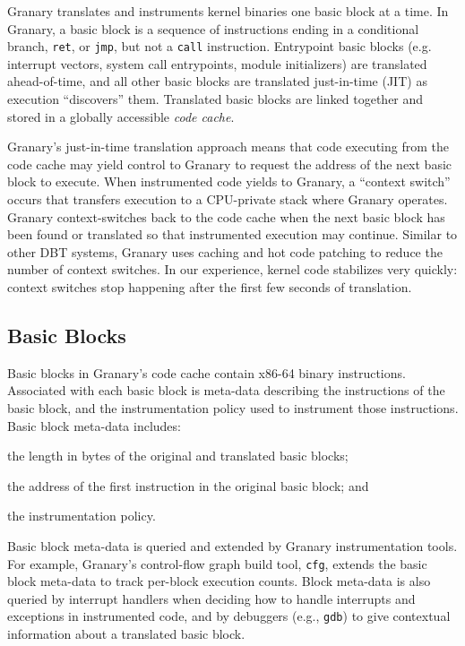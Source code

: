 \documentclass[preprint]{sigplanconf}
\begin{document}
Granary translates and instruments kernel binaries one basic block at a time. In Granary, a basic block is a sequence of instructions ending in a conditional branch, \texttt{ret}, or \texttt{jmp}, but not a \texttt{call} instruction. Entrypoint basic blocks (e.g. interrupt vectors, system call entrypoints, module initializers) are translated ahead-of-time, and all other basic blocks are translated just-in-time (JIT) as execution ``discovers'' them. Translated basic blocks are linked together and stored in a globally accessible \emph{code cache}.

Granary's just-in-time translation approach means that code executing from the code cache may yield control to Granary to request the address of the next basic block to execute. When instrumented code yields to Granary, a ``context switch'' occurs that transfers execution to a CPU-private stack where Granary operates. Granary context-switches back to the code cache when the next basic block has been found or translated so that instrumented execution may continue. Similar to other DBT systems, Granary uses caching and hot code patching to reduce the number of context switches. In our experience, kernel code stabilizes very quickly: context switches stop happening after the first few seconds of translation.

\subsection{Basic Blocks}

Basic blocks in Granary's code cache contain x86-64 binary instructions. Associated with each basic block is meta-data describing the instructions of the basic block, and the instrumentation policy used to instrument those instructions. Basic block meta-data includes: \begin{inparaenum}[i)]
	\item the length in bytes of the original and translated basic blocks;
	\item the address of the first instruction in the original basic block; and
	\item the instrumentation policy.
\end{inparaenum} Basic block meta-data is queried and extended by Granary instrumentation tools. For example, Granary's control-flow graph build tool, \texttt{cfg}, extends the basic block meta-data to track per-block execution counts. Block meta-data is also queried by interrupt handlers when deciding how to handle interrupts and exceptions in instrumented code, and by debuggers (e.g., \texttt{gdb}) to give contextual information about a translated basic block. 
\end{document}
